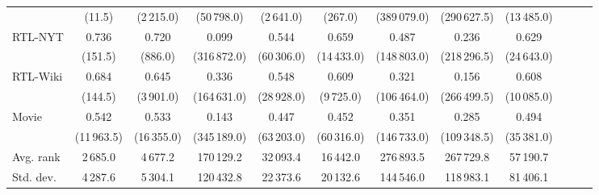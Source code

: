 \begin{sidewaysfigure}
\begin{tabular}{@{}lccccccccccc@{}}
& (11.5) & (2\,215.0) & (50\,798.0) & (2\,641.0) & (267.0) & (389\,079.0) & (290\,627.5) & (13\,485.0) \\
\multirow{2}{*}{RTL-NYT} &
\multicolumn{1}{c}{0.736} & \multicolumn{1}{c}{0.720} & \multicolumn{1}{c}{0.099} & \multicolumn{1}{c}{0.544} & \multicolumn{1}{c}{0.659} & \multicolumn{1}{c}{0.487} & \multicolumn{1}{c}{0.236} & \multicolumn{1}{c}{0.629} \\
& (151.5) & (886.0) & (316\,872.0) & (60\,306.0) & (14\,433.0) & (148\,803.0) & (218\,296.5) & (24\,643.0) \\
\multirow{2}{*}{RTL-Wiki} &
\multicolumn{1}{c}{0.684} & \multicolumn{1}{c}{0.645} & \multicolumn{1}{c}{0.336} & \multicolumn{1}{c}{0.548} & \multicolumn{1}{c}{0.609} & \multicolumn{1}{c}{0.321} & \multicolumn{1}{c}{0.156} & \multicolumn{1}{c}{0.608} \\
& (144.5) & (3\,901.0) & (164\,631.0) & (28\,928.0) & (9\,725.0) & (106\,464.0) & (266\,499.5) & (10\,085.0) \\
\multirow{2}{*}{Movie} &
\multicolumn{1}{c}{0.542} & \multicolumn{1}{c}{0.533} & \multicolumn{1}{c}{0.143} & \multicolumn{1}{c}{0.447} & \multicolumn{1}{c}{0.452} & \multicolumn{1}{c}{0.351} & \multicolumn{1}{c}{0.285} & \multicolumn{1}{c}{0.494} \\
& (11\,963.5) & (16\,355.0) & (345\,189.0) & (63\,203.0) & (60\,316.0) & (146\,733.0) & (109\,348.5) & (35\,381.0) \\
\midrule
Avg. rank & 2\,685.0 & 4\,677.2 & 170\,129.2 & 32\,093.4 & 16\,442.0 & 276\,893.5 & 267\,729.8 & 57\,190.7 \\
Std. dev. & 4\,287.6 & 5\,304.1 & 120\,432.8 & 22\,373.6 & 20\,132.6 & 144\,546.0 & 118\,983.1 & 81\,406.1 \\
\bottomrule
\end{tabular}
\end{sidewaysfigure}


